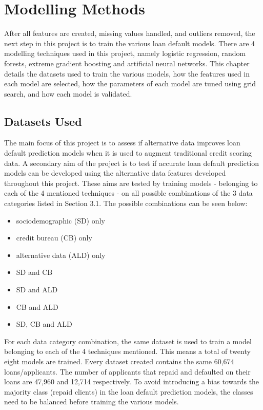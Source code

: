 \chapter{Modelling Methods} 
\label{Chapter4}

After all features are created, missing values handled, and outliers removed, the next step in this project is to train the various loan default models. There are 4 modelling techniques used in this project, namely logistic regression, random forests, extreme gradient boosting and artificial neural networks. This chapter details the datasets used to train the various models, how the features used in each model are selected, how the parameters of each model are tuned using grid search, and how each model is validated. \\

\section{Datasets Used}

The main focus of this project is to assess if alternative data improves loan default prediction models when it is used to augment traditional credit scoring data. A secondary aim of the project is to test if accurate loan default prediction models can be developed using the alternative data features developed throughout this project. These aims are tested by training models - belonging to each of the 4 mentioned techniques - on all possible combinations of the 3 data categories listed in Section 3.1. The possible combinations can be seen below: 

\vspace{10pt}

\begin{itemize}
    \item sociodemographic (SD) only 
    \item credit bureau (CB) only 
    \item alternative data (ALD) only 
    \item SD and CB
    \item SD and ALD
    \item CB and ALD
    \item SD, CB and ALD
\end{itemize}

\vspace{10pt}

For each data category combination, the same dataset is used to train a model belonging to each of the 4 techniques mentioned. This means a total of twenty eight models are trained. Every dataset created contains the same 60,674 loans/applicants. The number of applicants that repaid and defaulted on their loans are 47,960 and 12,714 respectively. To avoid introducing a bias towards the majority class (repaid clients) in the loan default prediction models, the classes need to be balanced before training the various models. 

